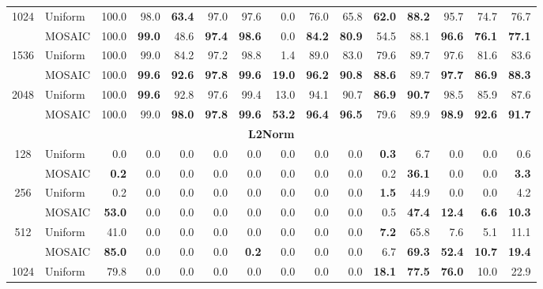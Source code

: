 \begin{table}[tp]
\begin{tabular}{@{} c l rrrrrrrrrrrrr @{}}
    \cmidrule(l){1-15}
    \multirow{2}{*}{1024} & Uniform & 100.0 & 98.0 & \textbf{63.4} & 97.0 & 97.6 & 0.0 & 76.0 & 65.8 & \textbf{62.0} & \textbf{88.2} & 95.7 & 74.7 & 76.7 \\
     & MOSAIC & 100.0 & \textbf{99.0} & 48.6 & \textbf{97.4} & \textbf{98.6} & 0.0 & \textbf{84.2} & \textbf{80.9} & 54.5 & 88.1 & \textbf{96.6} & \textbf{76.1} & \textbf{77.1} \\
    \cmidrule(l){1-15}
    \multirow{2}{*}{1536} & Uniform & 100.0 & 99.0 & 84.2 & 97.2 & 98.8 & 1.4 & 89.0 & 83.0 & 79.6 & 89.7 & 97.6 & 81.6 & 83.6 \\
     & MOSAIC & 100.0 & \textbf{99.6} & \textbf{92.6} & \textbf{97.8} & \textbf{99.6} & \textbf{19.0} & \textbf{96.2} & \textbf{90.8} & \textbf{88.6} & 89.7 & \textbf{97.7} & \textbf{86.9} & \textbf{88.3} \\
    \cmidrule(l){1-15}
    \multirow{2}{*}{2048} & Uniform & 100.0 & \textbf{99.6} & 92.8 & 97.6 & 99.4 & 13.0 & 94.1 & 90.7 & \textbf{86.9} & \textbf{90.7} & 98.5 & 85.9 & 87.6 \\
     & MOSAIC & 100.0 & 99.0 & \textbf{98.0} & \textbf{97.8} & \textbf{99.6} & \textbf{53.2} & \textbf{96.4} & \textbf{96.5} & 79.6 & 89.9 & \textbf{98.9} & \textbf{92.6} & \textbf{91.7} \\
    \midrule
    \multicolumn{15}{c}{\textbf{L2Norm}} \\
    \midrule
    \multirow{2}{*}{128} & Uniform & 0.0 & 0.0 & 0.0 & 0.0 & 0.0 & 0.0 & 0.0 & 0.0 & \textbf{0.3} & 6.7 & 0.0 & 0.0 & 0.6 \\
     & MOSAIC & \textbf{0.2} & 0.0 & 0.0 & 0.0 & 0.0 & 0.0 & 0.0 & 0.0 & 0.2 & \textbf{36.1} & 0.0 & 0.0 & \textbf{3.3} \\
    \cmidrule(l){1-15}
    \multirow{2}{*}{256} & Uniform & 0.2 & 0.0 & 0.0 & 0.0 & 0.0 & 0.0 & 0.0 & 0.0 & \textbf{1.5} & 44.9 & 0.0 & 0.0 & 4.2 \\
     & MOSAIC & \textbf{53.0} & 0.0 & 0.0 & 0.0 & 0.0 & 0.0 & 0.0 & 0.0 & 0.5 & \textbf{47.4} & \textbf{12.4} & \textbf{6.6} & \textbf{10.3} \\
    \cmidrule(l){1-15}
    \multirow{2}{*}{512} & Uniform & 41.0 & 0.0 & 0.0 & 0.0 & 0.0 & 0.0 & 0.0 & 0.0 & \textbf{7.2} & 65.8 & 7.6 & 5.1 & 11.1 \\
     & MOSAIC & \textbf{85.0} & 0.0 & 0.0 & 0.0 & \textbf{0.2} & 0.0 & 0.0 & 0.0 & 6.7 & \textbf{69.3} & \textbf{52.4} & \textbf{10.7} & \textbf{19.4} \\
    \cmidrule(l){1-15}
    \multirow{2}{*}{1024} & Uniform & 79.8 & 0.0 & 0.0 & 0.0 & 0.0 & 0.0 & 0.0 & 0.0 & \textbf{18.1} & \textbf{77.5} & \textbf{76.0} & 10.0 & 22.9 \\

\end{tabular}
\end{table}
